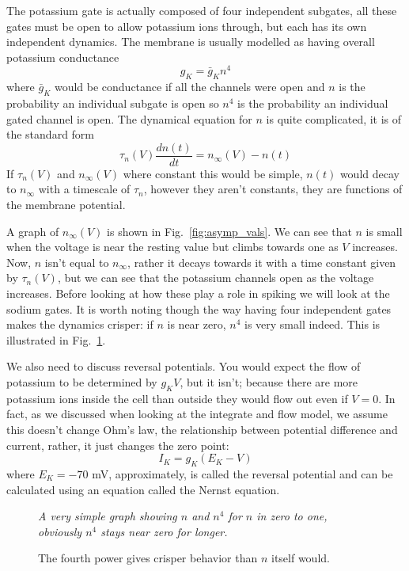 \documentclass[12pt]{article}
\begin{document}
The potassium gate is actually composed of four independent subgates,
all these gates must be open to allow potassium ions through, but each
has its own independent dynamics. The membrane is usually modelled as
having overall potassium conductance
\begin{equation}
g_{K}=\bar{g}_Kn^4
\end{equation}
where $\bar{g}_K$ would be conductance if all the channels were open
and $n$ is the probability an individual subgate is open so $n^4$ is
the probability an individual gated channel is open. The dynamical equation for $n$ is quite complicated, it is of the standard form
\begin{equation}
\tau_n(V)\frac{dn(t)}{dt}=n_\infty(V)-n(t)
\end{equation}
If $\tau_n(V)$ and $n_\infty(V)$ where constant this would be simple,
$n(t)$ would decay to $n_\infty$ with a timescale of $\tau_n$, however
they aren't constants, they are functions of the membrane potential. 

A graph of $n_\infty(V)$ is shown in Fig.~\ref{fig:asymp_vals}. We can
see that $n$ is small when the voltage is near the resting value but
climbs towards one as $V$ increases. Now, $n$ isn't equal to
$n_\infty$, rather it decays towards it with a time constant given by
$\tau_n(V)$, but we can see that the potassium channels open as the
voltage increases. Before looking at how these play a role in spiking
we will look at the sodium gates. It is worth noting though the way
having four independent gates makes the dynamics crisper: if $n$ is
near zero, $n^4$ is very small indeed. This is illustrated in
Fig.~\ref{fig:nfour}.

We also need to discuss reversal potentials. You would expect the flow
of potassium to be determined by $g_KV$, but it isn't; because there
are more potassium ions inside the cell than outside they would flow
out even if $V=0$. In fact, as we discussed when looking at the
integrate and flow model, we assume this doesn't change Ohm's law, the
relationship between potential difference and current, rather, it just
changes the zero point:
\begin{equation}
I_K=g_K(E_K-V)
\end{equation}
where $E_K=-70$ mV, approximately, is called the reversal potential
and can be calculated using an equation called the Nernst equation.

\begin{figure}
             {\textsl{A very simple graph showing $n$ and $n^4$ for $n$ in zero to one, obviously $n^4$ stays near zero for longer.}}
             {
\begin{center}

\end{center}
}
\caption{The fourth power gives crisper behavior than $n$ itself would.\label{fig:nfour}}
\end{figure}
\end{document}
